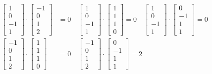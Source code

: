 \documentclass{math}
\begin{document}
\begin{align*}
  \begin{bmatrix}1 \\ 0 \\ -1 \\ 1\end{bmatrix}\cdot
    \begin{bmatrix}-1 \\ 0 \\ 1 \\ 2\end{bmatrix} &= 0 \quad
  \begin{bmatrix}1 \\ 0 \\ -1 \\ 1\end{bmatrix}\cdot
    \begin{bmatrix}1 \\ 1 \\ 1 \\ 0\end{bmatrix} = 0 \quad
  \begin{bmatrix}1 \\ 0 \\ -1 \\ 1\end{bmatrix}\cdot
    \begin{bmatrix}0 \\ -1 \\ 1 \\ 1\end{bmatrix} = 0 \\
  \begin{bmatrix}-1 \\ 0 \\ 1 \\ 2\end{bmatrix}\cdot
    \begin{bmatrix}1 \\ 1 \\ 1 \\ 0\end{bmatrix} &= 0 \quad
  \begin{bmatrix}-1 \\ 0 \\ 1 \\ 2\end{bmatrix}\cdot
    \begin{bmatrix}0 \\ -1 \\ 1 \\ 1\end{bmatrix} = 2
\end{align*}
\end{document}
